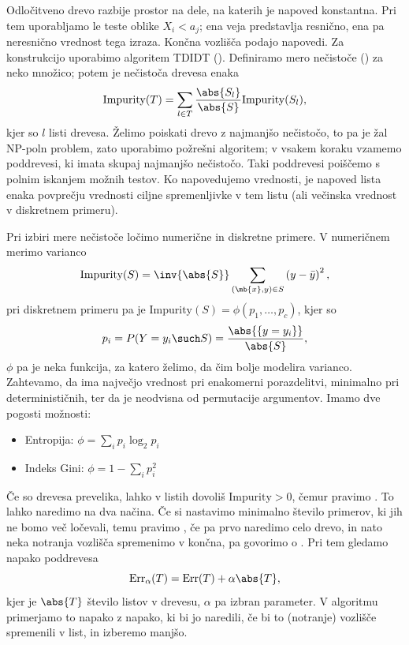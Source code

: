 
Odločitveno drevo razbije prostor na dele, na katerih je napoved konstantna.
Pri tem uporabljamo le teste oblike $X_i < a_j$; ena veja predstavlja resnično,
ena pa neresnično vrednost tega izraza.
Končna vozlišča podajo napovedi.
Za konstrukcijo uporabimo algoritem TDIDT ().
Definiramo mero nečistoče () za neko množico; potem je nečistoča
drevesa enaka
\[
  \text{Impurity}(T) = \sum_{l \in T} \frac{\abs{S_l}}{\abs{S}}
  \text{Impurity}(S_l),
\]
kjer so $l$ listi drevesa.
Želimo poiskati drevo z najmanjšo nečistočo, to pa je žal NP-poln problem, zato
uporabimo požrešni algoritem; v vsakem koraku vzamemo poddrevesi, ki imata
skupaj najmanjšo nečistočo.
Taki poddrevesi poiščemo s polnim iskanjem možnih testov.
Ko napovedujemo vrednosti, je napoved lista enaka povprečju vrednosti ciljne
spremenljivke v tem listu (ali večinska vrednost v diskretnem primeru).


Pri izbiri mere nečistoče ločimo numerične in diskretne primere.
V numeričnem merimo varianco
\[
  \text{Impurity}(S) = \inv{\abs{S}} \sum_{(\mb{x}, y) \in S} \left( y - \bar{y}
  \right)^2,
\]
pri diskretnem primeru pa je $\text{Impurity}(S) = \phi(p_1, \ldots, p_c)$,
kjer so
\[
  p_i = P(Y = y_i \such S) = \frac{\abs{\{y = y_i\}}}{\abs{S}},
\]
$\phi$ pa je neka funkcija, za katero želimo, da čim bolje modelira varianco.
Zahtevamo, da ima največjo vrednost pri enakomerni porazdelitvi, minimalno pri
determinističnih, ter da je neodvisna od permutacije argumentov.
Imamo dve pogosti možnosti:
\begin{itemize}
\item Entropija: $\phi = \sum_i p_i \log_2 p_i$
\item Indeks Gini: $\phi = 1 - \sum_i p_i^2$
\end{itemize}


Če so drevesa prevelika, lahko v listih dovoliš $\text{Impurity} > 0$, čemur
pravimo .
To lahko naredimo na dva načina.
Če si nastavimo minimalno število primerov, ki jih ne bomo več ločevali, temu
pravimo , če pa prvo naredimo celo drevo, in nato neka
notranja vozlišča spremenimo v končna, pa govorimo o .
Pri tem gledamo napako poddrevesa
\[
  \text{Err}_\alpha(T) = \text{Err}(T) + \alpha \abs{T},
\]
kjer je $\abs{T}$ število listov v drevesu, $\alpha$ pa izbran parameter.
V algoritmu primerjamo to napako z napako, ki bi jo naredili, če bi to
(notranje) vozlišče spremenili v list, in izberemo manjšo.


